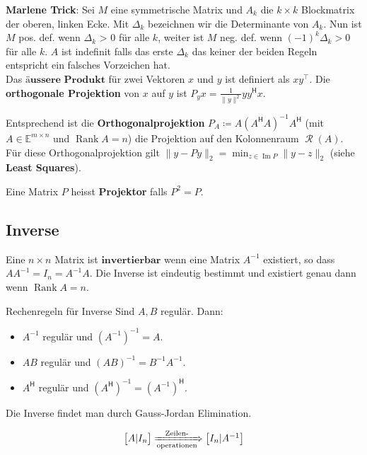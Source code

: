 \documentclass[a4paper,10pt]{article}
\DeclareMathOperator{\Rank}{Rank}
\DeclareMathOperator{\Image}{Im}
\DeclareMathOperator{\Columnspace}{\mathcal{R}}
\newcommand*{\hermconj}{\mathsf{H}}
\def\E{\mathbb{E}}
\begin{document}
\textbf{Marlene Trick}: Sei $M$ eine symmetrische Matrix und $A_k$ die $k \times k$ Blockmatrix der oberen, linken Ecke. Mit $\Delta_k$ bezeichnen wir die Determinante von $A_k$. Nun ist $M$ pos. def. wenn $\Delta_k$ > 0 für alle $k$, weiter ist $M$ neg. def.
wenn $(-1)^k \Delta_k > 0$ für alle $k$. $A$ ist indefinit falls das erste $\Delta_k$ das keiner der beiden Regeln entspricht ein falsches Vorzeichen hat.\\

Das $\textbf{äussere Produkt}$ für zwei Vektoren $x$ und $y$ ist definiert als $xy^\top$. Die \textbf{orthogonale Projektion} von $x$ auf $y$ ist $P_y x = \frac{1}{\lVert y \rVert^2} y y^\hermconj x$.

Entsprechend ist die \textbf{Orthogonalprojektion} $P_A \coloneqq A(A^\hermconj A)^{-1} A^\hermconj$ (mit $A \in \E^{m \times n}$ und $\Rank A = n$) die Projektion auf den Kolonnenraum $\Columnspace(A)$. Für diese Orthogonalprojektion gilt $\lVert y - Py \rVert_2 = \min_{z \in \Image P} \lVert y - z \rVert_2$ (siehe \textbf{Least Squares}).

Eine Matrix $P$ heisst \textbf{Projektor} falls $P^2 = P$.

\subsection{Inverse}

Eine $n \times n$ Matrix ist $\textbf{invertierbar}$ wenn eine Matrix $A^{-1}$ existiert, so dass $A A^{-1} = I_n = A^{-1} A$. Die Inverse ist eindeutig bestimmt und existiert genau dann wenn $\Rank A = n$.

\begin{subbox}{Rechenregeln für Inverse}
  Sind $A, B$ regulär. Dann:

  \begin{itemize}
    \item $A^{-1}$ regulär und $(A^{-1})^{-1} = A$.
    \item $AB$ regulär und $(AB)^{-1} = B^{-1} A^{-1}$.
    \item $A^\hermconj$ regulär und $(A^\hermconj)^{-1} = (A^{-1})^\hermconj$.
  \end{itemize}
\end{subbox}

Die Inverse findet man durch Gauss-Jordan Elimination.

$$\begin{bmatrix*}
  A | I_n
\end{bmatrix*} \xRightarrow[\text{operationen}]{\text{Zeilen-}} \begin{bmatrix*}
  I_n | A^{-1}
\end{bmatrix*}$$
\end{document}
